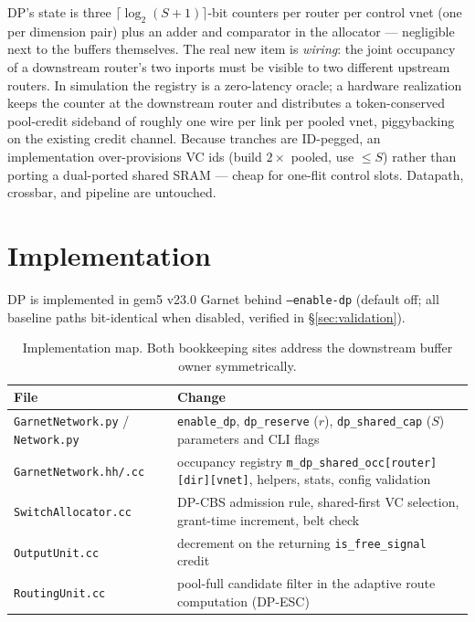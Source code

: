 \documentclass[10pt]{article}
\begin{document}
DP's state is three $\lceil \log_2(S{+}1) \rceil$-bit counters per router
per control vnet (one per dimension pair) plus an adder and comparator in
the allocator --- negligible next to the buffers themselves. The real new
item is \emph{wiring}: the joint occupancy of a downstream router's two
inports must be visible to two different upstream routers. In simulation
the registry is a zero-latency oracle; a hardware realization keeps the
counter at the downstream router and distributes a token-conserved
pool-credit sideband of roughly one wire per link per pooled vnet,
piggybacking on the existing credit channel. Because tranches are
ID-pegged, an implementation over-provisions VC ids (build $2\times$
pooled, use $\le S$) rather than porting a dual-ported shared SRAM ---
cheap for one-flit control slots. Datapath, crossbar, and pipeline are
untouched.

\section{Implementation}
\label{sec:impl}

DP is implemented in gem5 v23.0 Garnet behind \texttt{--enable-dp}
(default off; all baseline paths bit-identical when disabled, verified in
\S\ref{sec:validation}).

\begin{table}[H]
\centering
\small
\begin{tabular}{lp{}}
\toprule
File & Change \\
\midrule
\texttt{GarnetNetwork.py} / \texttt{Network.py} &
  \texttt{enable\_dp}, \texttt{dp\_reserve} ($r$), \texttt{dp\_shared\_cap}
  ($S$) parameters and CLI flags \\
\texttt{GarnetNetwork.hh/.cc} &
  occupancy registry \texttt{m\_dp\_shared\_occ[router][dir][vnet]},
  helpers, stats, config validation \\
\texttt{SwitchAllocator.cc} &
  DP-CBS admission rule, shared-first VC selection, grant-time
  increment, belt check \\
\texttt{OutputUnit.cc} &
  decrement on the returning \texttt{is\_free\_signal} credit \\
\texttt{RoutingUnit.cc} &
  pool-full candidate filter in the adaptive route computation (DP-ESC) \\
\bottomrule
\end{tabular}
\caption{Implementation map. Both bookkeeping sites address the
downstream buffer owner symmetrically.}
\label{tab:impl}
\end{table}
\end{document}
